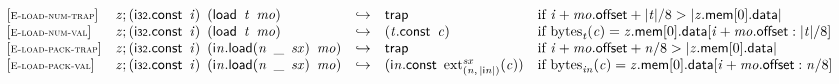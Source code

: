 $$
\begin{array}{@{}l@{}lcl@{}l@{}}
{[\textsc{\scriptsize E{-}load{-}num{-}trap}]} \quad & {\mathit{z}} ; (\mathsf{i{\scriptstyle32}}.\mathsf{const}~\,{\mathit{i}})~\,(\mathsf{load}~\,{\mathit{t}}~\,{\mathit{mo}}) &\hookrightarrow& \mathsf{trap} &\quad
  \mbox{if}~{\mathit{i}} + {\mathit{mo}}.\mathsf{offset} + {|{\mathit{t}}|} / 8 > {|{{\mathit{z}}.\mathsf{mem}}{{}[0]}.\mathsf{data}|} \\
{[\textsc{\scriptsize E{-}load{-}num{-}val}]} \quad & {\mathit{z}} ; (\mathsf{i{\scriptstyle32}}.\mathsf{const}~\,{\mathit{i}})~\,(\mathsf{load}~\,{\mathit{t}}~\,{\mathit{mo}}) &\hookrightarrow& ({\mathit{t}}.\mathsf{const}~\,{\mathit{c}}) &\quad
  \mbox{if}~{{\mathrm{bytes}}}_{{\mathit{t}}}({\mathit{c}}) = {{\mathit{z}}.\mathsf{mem}}{{}[0]}.\mathsf{data}{}[{\mathit{i}} + {\mathit{mo}}.\mathsf{offset} : {|{\mathit{t}}|} / 8] \\
{[\textsc{\scriptsize E{-}load{-}pack{-}trap}]} \quad & {\mathit{z}} ; (\mathsf{i{\scriptstyle32}}.\mathsf{const}~\,{\mathit{i}})~\,({{\mathsf{i}}{{\mathit{n}}}.\mathsf{load}}{({\mathit{n}}~\,\mathsf{\_}~\,{\mathit{sx}})}~\,{\mathit{mo}}) &\hookrightarrow& \mathsf{trap} &\quad
  \mbox{if}~{\mathit{i}} + {\mathit{mo}}.\mathsf{offset} + {\mathit{n}} / 8 > {|{{\mathit{z}}.\mathsf{mem}}{{}[0]}.\mathsf{data}|} \\
{[\textsc{\scriptsize E{-}load{-}pack{-}val}]} \quad & {\mathit{z}} ; (\mathsf{i{\scriptstyle32}}.\mathsf{const}~\,{\mathit{i}})~\,({{\mathsf{i}}{{\mathit{n}}}.\mathsf{load}}{({\mathit{n}}~\,\mathsf{\_}~\,{\mathit{sx}})}~\,{\mathit{mo}}) &\hookrightarrow& ({\mathsf{i}}{{\mathit{n}}}.\mathsf{const}~\,{{{{\mathrm{ext}}}_{({\mathit{n}},\, {|{\mathsf{i}}{{\mathit{n}}}|})}^{{\mathit{sx}}}}}{({\mathit{c}})}) &\quad
  \mbox{if}~{{\mathrm{bytes}}}_{{{\mathit{i}}}{{\mathit{n}}}}({\mathit{c}}) = {{\mathit{z}}.\mathsf{mem}}{{}[0]}.\mathsf{data}{}[{\mathit{i}} + {\mathit{mo}}.\mathsf{offset} : {\mathit{n}} / 8] \\
\end{array}
$$

\vspace{1ex}

